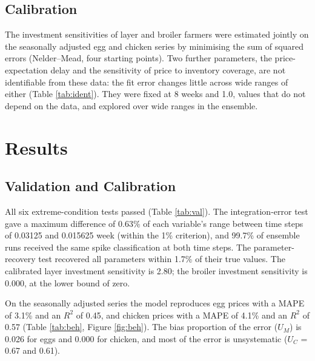 \documentclass[10pt,twocolumn,a4paper]{article}
\begin{document}
\subsection{Calibration}

The investment sensitivities of layer and broiler farmers were estimated jointly on the seasonally adjusted egg and chicken series by minimising the sum of squared errors (Nelder--Mead, four starting points). Two further parameters, the price-expectation delay and the sensitivity of price to inventory coverage, are not identifiable from these data: the fit error changes little across wide ranges of either (Table \ref{tab:ident}). They were fixed at 8 weeks and 1.0, values that do not depend on the data, and explored over wide ranges in the ensemble.


\section{Results}\label{sec:results}

\subsection{Validation and Calibration}\label{sec:val}

All six extreme-condition tests passed (Table \ref{tab:val}). The integration-error test gave a maximum difference of 0.63\% of each variable's range between time steps of 0.03125 and 0.015625 week (within the 1\% criterion), and 99.7\% of ensemble runs received the same spike classification at both time steps. The parameter-recovery test recovered all parameters within 1.7\% of their true values. The calibrated layer investment sensitivity is 2.80; the broiler investment sensitivity is 0.000, at the lower bound of zero.


On the seasonally adjusted series the model reproduces egg prices with a MAPE of 3.1\% and an $R^2$ of 0.45, and chicken prices with a MAPE of 4.1\% and an $R^2$ of 0.57 (Table \ref{tab:beh}, Figure \ref{fig:beh}). The bias proportion of the error ($U_M$) is 0.026 for eggs and 0.000 for chicken, and most of the error is unsystematic ($U_C$ = 0.67 and 0.61).
\end{document}
